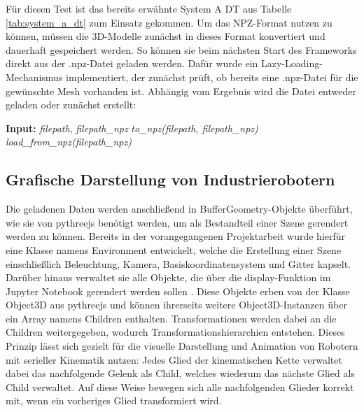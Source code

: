 Für diesen Test ist das bereits erwähnte System A DT aus Tabelle \ref{tab:system_a_dt} zum Einsatz gekommen.
Um das NPZ-Format nutzen zu können, müssen die 3D-Modelle zunächst in dieses Format konvertiert und dauerhaft gespeichert werden.
So können sie beim nächsten Start des Frameworks direkt aus der .npz-Datei geladen werden.
Dafür wurde ein Lazy-Loading-Mechanismus implementiert, der zunächst prüft, ob bereits eine .npz-Datei für die gewünschte Mesh vorhanden ist.
Abhängig vom Ergebnis wird die Datei entweder geladen oder zunächst erstellt:

\vspace{1em}
    \begin{algorithm}
        \caption{Laden eines 3D-Modells aus einer NPZ-Datei}
        \begin{algorithmic}[1]
            \State \textbf{Input:} \textit{filepath}, \textit{filepath\_npz}
                \State \textit{to\_npz(filepath, filepath\_npz)}
            \EndIf
            \State \Return \textit{load\_from\_npz(filepath\_npz)}
        \end{algorithmic}
    \end{algorithm}
\vspace{1em}











\subsection{Grafische Darstellung von Industrierobotern}

Die geladenen Daten werden anschließend in BufferGeometry-Objekte überführt, wie sie von pythreejs benötigt werden, 
um als Bestandteil einer Szene gerendert werden zu können. 
Bereits in der vorangegangenen Projektarbeit wurde hierfür eine Klasse namens Environment entwickelt, 
welche die Erstellung einer Szene einschließlich Beleuchtung, Kamera, Basiskoordinatensystem und Gitter kapselt. 
Darüber hinaus verwaltet sie alle Objekte, die über die display-Funktion im Jupyter Notebook gerendert werden sollen .
Diese Objekte erben von der Klasse Object3D aus pythreejs und können ihrerseits weitere Object3D-Instanzen über ein Array namens Children enthalten. 
Transformationen werden dabei an die Children weitergegeben, wodurch Transformationshierarchien entstehen. 
Dieses Prinzip lässt sich gezielt für die visuelle Darstellung und Animation von Robotern mit serieller Kinematik nutzen: 
Jedes Glied der kinematischen Kette verwaltet dabei das nachfolgende Gelenk als Child, welches wiederum das nächste Glied als Child verwaltet. 
Auf diese Weise bewegen sich alle nachfolgenden Glieder korrekt mit, wenn ein vorheriges Glied transformiert wird.

